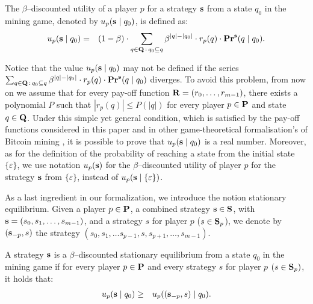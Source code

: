 \begin{mydef}
\label{def-utility}
The $\beta$--discounted utility of a player $p$ for a strategy $\mathbf{s}$ from a state $q_0$ in
the mining game, denoted by $u_p(\mathbf{s} \mid q_0)$, is defined as:
\begin{eqnarray*}
u_p(\mathbf{s} \mid q_0) & = & (1 - \beta) \cdot \sum_{q \in \mathbf{Q} \,:\, q_0 \subseteq q} \beta^{|q|-|q_0|} \cdot r_p(q) \cdot \mathbf{Pr}^{\mathbf{s}}(q \mid q_0).
\end{eqnarray*}
\end{mydef}
Notice that the value $u_p(\mathbf{s} \mid q_0)$ may not be defined if the series $\sum_{q \in \mathbf{Q} \,:\, q_0 \subseteq q} \beta^{|q|-|q_0|} \cdot r_p(q) \cdot \mathbf{Pr}^{\mathbf{s}}(q \mid q_0)$ diverges. To avoid this problem, from now on we assume that for every pay-off function $\mathbf{R} = (r_0, \ldots, r_{m-1})$, there exists a polynomial $P$ such that $|r_p(q)| \leq P(|q|)$ for every player $p \in \mathbf{P}$ and state $q \in \mathbf{Q}$. Under this simple yet general condition, which is satisfied by the pay-off functions considered in this paper and in other game-theoretical formalisation's of Bitcoin mining \cite{mininggames:2016}, it is possible to prove that $u_p(\mathbf{s} \mid q_0)$ is a real number. Moreover, as for the definition of the probability of reaching a state from the initial state $\{\varepsilon\}$, we use notation $u_p(\mathbf{s})$ for the $\beta$--discounted utility of player $p$ for the strategy $\mathbf{s}$ from $\{\varepsilon\}$, instead of $u_p(\mathbf{s} \mid \{\varepsilon\})$. 

As a last ingredient in our formalization, we introduce the notion stationary equilibrium.
Given a player $p \in \mathbf{P}$, a combined strategy $\mathbf{s} \in \mathbf{S}$, with $\mathbf{s} = (s_0,s_1, \ldots, s_{m-1})$, and a strategy $s$ for player $p$ ($s \in \mathbf{S}_p$), we denote by $(\mathbf{s}_{-p}, s)$ the strategy $(s_0, s_1, \ldots s_{p-1},s,s_{p+1}, \ldots, s_{m-1})$.
\begin{mydef}
A strategy $\mathbf{s}$ is a $\beta$--discounted stationary equilibrium from a state $q_0$ in the %
mining game if for every player $p \in \mathbf{P}$ and every strategy $s$ for player $p$ $(s \in\mathbf{S}_p)$, it holds that:
\begin{eqnarray*}u_p(\mathbf{s} \mid q_0) & \geq & u_p ((\mathbf{s}_{-p},s) \mid q_0).
\end{eqnarray*}
\end{mydef}

